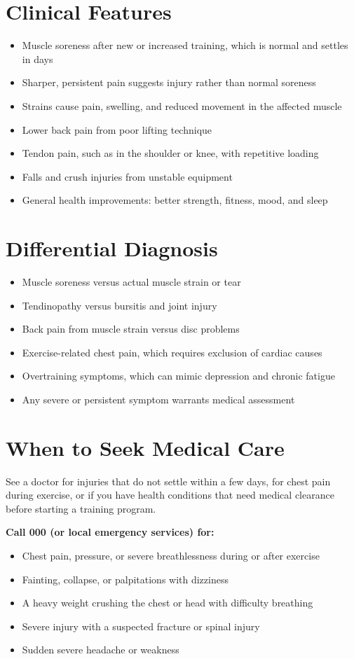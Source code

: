 \section*{Clinical Features}
\begin{itemize}
    \item Muscle soreness after new or increased training, which is normal and settles in days
    \item Sharper, persistent pain suggests injury rather than normal soreness
    \item Strains cause pain, swelling, and reduced movement in the affected muscle
    \item Lower back pain from poor lifting technique
    \item Tendon pain, such as in the shoulder or knee, with repetitive loading
    \item Falls and crush injuries from unstable equipment
    \item General health improvements: better strength, fitness, mood, and sleep
\end{itemize}

\section*{Differential Diagnosis}
\begin{itemize}
    \item Muscle soreness versus actual muscle strain or tear
    \item Tendinopathy versus bursitis and joint injury
    \item Back pain from muscle strain versus disc problems
    \item Exercise-related chest pain, which requires exclusion of cardiac causes
    \item Overtraining symptoms, which can mimic depression and chronic fatigue
    \item Any severe or persistent symptom warrants medical assessment
\end{itemize}

\section*{When to Seek Medical Care}
See a doctor for injuries that do not settle within a few days, for chest pain during exercise, or if you have health conditions that need medical clearance before starting a training program.

\textbf{Call 000 (or local emergency services) for:}
\begin{itemize}
    \item Chest pain, pressure, or severe breathlessness during or after exercise
    \item Fainting, collapse, or palpitations with dizziness
    \item A heavy weight crushing the chest or head with difficulty breathing
    \item Severe injury with a suspected fracture or spinal injury
    \item Sudden severe headache or weakness
\end{itemize}

